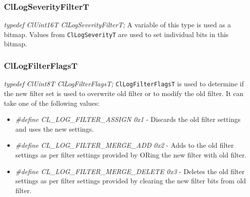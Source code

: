 \begin{flushleft}
\subsubsection{ClLogSeverityFilterT}
\textit{typedef ClUint16T ClLogSeverityFilterT;}
\newline
\newline
A variable of this type is used as a bitmap. Values from {\tt{ClLogSeverityT}} are used to set individual bits in this bitmap.




\subsubsection{ClLogFilterFlagsT}
\textit{typedef ClUint8T ClLogFilterFlagsT;}
\newline
\newline
{\tt{ClLogFilterFlagsT}} is used to determine if the new filter set is used to overwrite old filter or to
modify the old filter. It can take one of the following values:
\begin{itemize}
\item
\textit{\#define CL\_\-LOG\_\-FILTER\_\-ASSIGN 0x1} - Discards the old filter settings and uses the new settings.
\item
\textit{\#define CL\_\-LOG\_\-FILTER\_\-MERGE\_\-ADD	0x2} - Adds to the old filter settings as per filter settings provided by ORing 
the new filter with old filter.
\item
\textit{\#define CL\_\-LOG\_\-FILTER\_\-MERGE\_\-DELETE 0x3} - Deletes the old filter settings as per filter settings provided by 
clearing the new filter bits from old filter.
\end{itemize}	



\end{flushleft}
